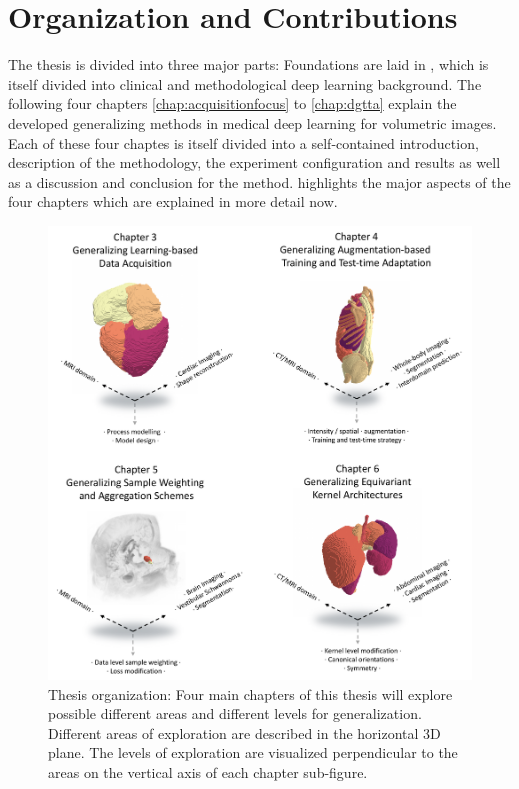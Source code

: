         \section{Organization and Contributions}  %
            \label{sec:organization}
            The thesis is divided into three major parts:
            Foundations are laid in  , which is itself divided into clinical and methodological deep learning background.
            The following four chapters \ref{chap:acquisitionfocus} to \ref{chap:dgtta} explain the developed generalizing methods in medical deep learning for volumetric images. Each of these four chaptes is itself divided into a self-contained introduction, description of the methodology, the experiment configuration and results as well as a discussion and conclusion for the method. %
             highlights the major aspects of the four chapters which are explained in more detail now.

            \begin{figure}
                \includegraphics[width=\textwidth]{sections/01_introduction/figures/draft_areas_levels.pdf}
                \caption{Thesis organization: Four main chapters of this thesis will explore possible different areas and different levels for generalization. Different areas of exploration are described in the horizontal 3D plane. The levels of exploration are visualized perpendicular to the areas on the vertical axis of each chapter sub-figure.}
                \label{fig:draft}
            \end{figure}

